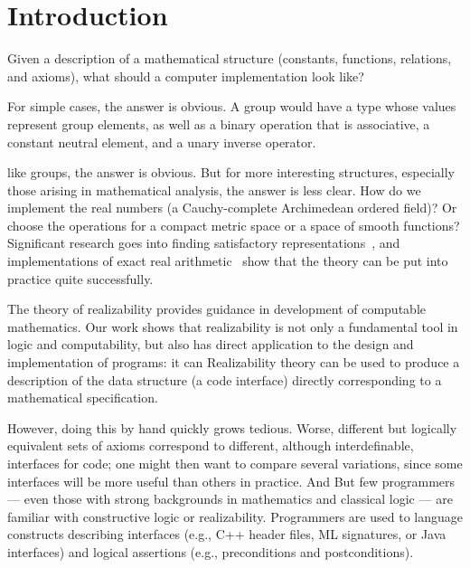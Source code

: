 \section{Introduction}
\label{sec:introduction}

Given a description of a mathematical structure (constants,
functions, relations, and axioms), what should a computer
implementation look like?

For simple cases,
\iflong
the answer is obvious. A
group would have a type whose values represent group elements, as well
as a binary operation that is associative, a constant 
neutral element, and a unary inverse operator.

\else %
like groups, the answer is obvious.
\fi %
%
But for more interesting structures, especially those arising in
mathematical analysis, the answer is less clear. How do we
implement the real numbers (a Cauchy-complete Archimedean ordered
field)? Or choose the operations for a compact metric
space or a space of smooth functions? Significant research goes into
finding satisfactory representations~\cite{Wei00,TZ98,Bla97,EL00}, and
implementations of exact real arithmetic~\cite{Mue00,Lam05a} show that
the theory can be put into practice quite successfully.

\iflong
The theory of realizability provides guidance in development of
computable mathematics.  Our work shows that realizability is
not only  a
fundamental tool in logic and computability, but also
has direct application to the design and implementation of programs:
it can
\else %
Realizability theory can be used to 
\fi %
produce a description of the data structure (a code interface)
directly corresponding to a mathematical specification.
%
\iflong

\fi %
%
\iflong
However, doing this by hand quickly grows tedious. 
Worse, different
but logically equivalent sets of axioms correspond to different,
although interdefinable, interfaces for code; one might then want to
compare several variations, since some interfaces will be more useful
than others in practice.
And 
\else
But
\fi %
few programmers --- even those with strong backgrounds in
mathematics and classical logic --- are familiar with constructive logic or
realizability. 
\iflong
Programmers are used to language constructs
describing interfaces (e.g., C++ header files, ML signatures, or Java
interfaces) and logical assertions (e.g., preconditions
and postconditions).
\fi

